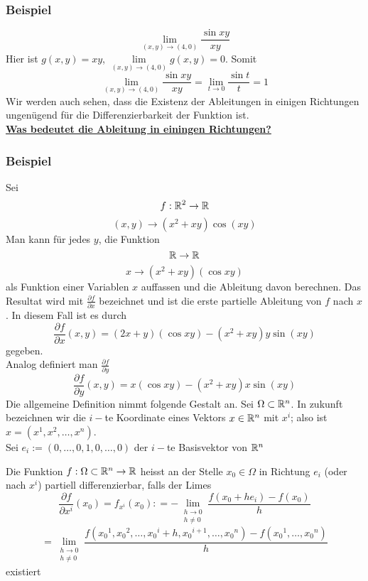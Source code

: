 \subsubsection*{Beispiel}
\[\mathop {\lim }\limits_{(x,y) \to (4,0)} \frac{{\sin xy}}{{xy}}\] Hier ist $g(x,y)=xy$, $\mathop {\lim }\limits_{(x,y) \to (4,0)} g(x,y) = 0$. Somit \[\mathop {\lim }\limits_{(x,y) \to (4,0)} \frac{{\sin xy}}{{xy}} = \mathop {\lim }\limits_{t \to 0} \frac{{\sin t}}{t} = 1\] Wir werden auch sehen, dass die Existenz der Ableitungen in einigen Richtungen ungenügend für die Differenzierbarkeit der Funktion ist. \\

\noindent\textbf{\underline{Was bedeutet die Ableitung in einingen Richtungen?}}
\subsubsection*{Beispiel}
Sei \[f:\mathbb{R}^2\to \mathbb{R}\]\[(x,y)\to \left(x^2+xy\right)\cos(xy)\]Man kann für jedes $y$, die Funktion \[\mathbb{R}\to\mathbb{R}\]\[x\to \left( x^2+xy\right)\left(\cos xy\right)\]als Funktion einer Variablen $x$ auffassen und die Ableitung davon berechnen. Das Resultat wird mit $\frac{\partial f}{\partial x}$ bezeichnet und ist die erste partielle Ableitung von $f$ nach $x$. In diesem Fall ist es durch \[\frac{{\partial f}}{{\partial x}}(x,y) = (2x + y)(\cos xy) - ({x^2} + xy)y\sin (xy)\] gegeben. \\

\noindent Analog definiert man $\frac{\partial f}{\partial y}$\[\frac{{\partial f}}{{\partial y}}(x,y) = x(\cos xy) - ({x^2} + xy)x\sin (xy)\] Die allgemeine Definition nimmt folgende Gestalt an. Sei $\Omega \subset\mathbb{R}^n$. In zukunft  bezeichnen wir die $i-$te Koordinate eines Vektors $x\in\mathbb{R}^n$ mit $x^i$; also ist $x=\left( x^1,x^2,\dots,x^n\right)$.\\

\noindent Sei $e_i:=\left( 0,\dots,0,1,0,\dots,0\right)$ der $i-$te Basisvektor von $\mathbb{R}^n$

\begin{definition}{8.2}
Die Funktion $f:\Omega\subset\mathbb{R}^n\to\mathbb{R}$ heisst an der Stelle $x_0\in\Omega$ in Richtung $e_i$ (oder nach $x^i$) partiell differenzierbar, falls der Limes \[\frac{{\partial f}}{{\partial {x^i}}}({x_0}) = {f_{{x^i}}}({x_0}): =  - \mathop {\lim }\limits_{\begin{array}{*{20}{c}}
{h \to 0}\\
{h\not  = 0}
\end{array}} \frac{{f({x_0} + h{e_i}) - f({x_0})}}{h}\]
\[ = \mathop {\lim }\limits_{\begin{array}{*{20}{c}}
{h \to 0}\\
{h\not  = 0}
\end{array}} \frac{{f\left( {{x_0}^1,{x_0}^2, \ldots ,{x_0}^i + h,{x_0}^{i + 1}, \ldots ,{x_0}^n} \right) - f\left( {{x_0}^1, \ldots ,{x_0}^n} \right)}}{h}\]
existiert
\end{definition}

